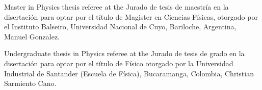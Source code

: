 \ifeng
Master in Physics thesis referee at the
\else
Jurado de tesis de maestría en la disertación para optar por el título de Magister en Ciencias Físicas, otorgado por el 
\fi
Instituto Balseiro, Universidad Nacional de Cuyo, Bariloche, Argentina, Manuel Gonzalez.

\ifeng
Undergraduate thesis in Physics referee at the  
\else
Jurado de tesis de grado en la disertación para optar por el título de Físico otorgado por la 
\fi
Universidad Industrial de Santander (Escuela de Física), Bucaramanga, Colombia, Christian Sarmiento Cano.
